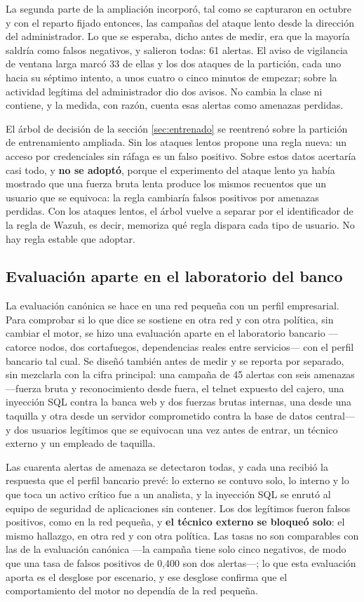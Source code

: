 La segunda parte de la ampliación incorporó, tal como se capturaron en octubre y con el reparto
fijado entonces, las campañas del ataque lento desde la dirección del administrador. Lo que se
esperaba, dicho antes de medir, era que la mayoría saldría como falsos negativos, y salieron todas:
61 alertas. El aviso de vigilancia de ventana larga marcó 33 de ellas y los dos ataques de la
partición, cada uno hacia su séptimo intento, a unos cuatro o cinco minutos de empezar; sobre la
actividad legítima del administrador dio dos avisos. No cambia la clase ni contiene, y la medida,
con razón, cuenta esas alertas como amenazas perdidas.

El árbol de decisión de la sección \ref{sec:entrenado} se reentrenó sobre la partición de
entrenamiento ampliada. Sin los ataques lentos propone una regla nueva: un acceso por credenciales
sin ráfaga es un falso positivo. Sobre estos datos acertaría casi todo, y \textbf{no se adoptó},
porque el experimento del ataque lento ya había mostrado que una fuerza bruta lenta produce los
mismos recuentos que un usuario que se equivoca: la regla cambiaría falsos positivos por amenazas
perdidas. Con los ataques lentos, el árbol vuelve a separar por el identificador de la regla de
Wazuh, es decir, memoriza qué regla dispara cada tipo de usuario. No hay regla estable que adoptar.

\subsection{Evaluación aparte en el laboratorio del banco}
\label{sec:eval-banco}

La evaluación canónica se hace en una red pequeña con un perfil empresarial. Para comprobar si lo
que dice se sostiene en otra red y con otra política, sin cambiar el motor, se hizo una evaluación
aparte en el laboratorio bancario ---catorce nodos, dos cortafuegos, dependencias reales entre
servicios--- con el perfil bancario tal cual. Se diseñó también antes de medir y se reporta por
separado, sin mezclarla con la cifra principal: una campaña de 45 alertas con seis amenazas
---fuerza bruta y reconocimiento desde fuera, el telnet expuesto del cajero, una inyección SQL
contra la banca web y dos fuerzas brutas internas, una desde una taquilla y otra desde un servidor
comprometido contra la base de datos central--- y dos usuarios legítimos que se equivocan una vez
antes de entrar, un técnico externo y un empleado de taquilla.

Las cuarenta alertas de amenaza se detectaron todas, y cada una recibió la respuesta que el perfil bancario
prevé: lo externo se contuvo solo, lo interno y lo que toca un activo crítico fue a un analista, y
la inyección SQL se enrutó al equipo de seguridad de aplicaciones sin contener. Los dos legítimos
fueron falsos positivos, como en la red pequeña, y \textbf{el técnico externo se bloqueó solo}: el
mismo hallazgo, en otra red y con otra política. Las tasas no son comparables con las de la
evaluación canónica ---la campaña tiene solo cinco negativos, de modo que una tasa de falsos
positivos de 0,400 son dos alertas---; lo que esta evaluación aporta es el desglose por escenario,
y ese desglose confirma que el comportamiento del motor no dependía de la red pequeña.


